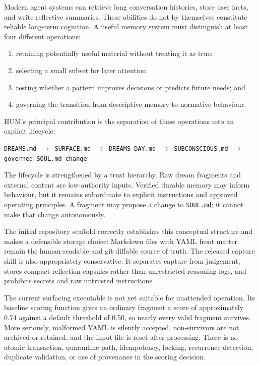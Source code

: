 \documentclass[11pt,a4paper]{article}
\begin{document}
Modern agent systems can retrieve long conversation histories, store user facts, and write reflective summaries. These abilities do not by themselves constitute reliable long-term cognition. A useful memory system must distinguish at least four different operations:

\begin{enumerate}
  \item retaining potentially useful material without treating it as true;
  \item selecting a small subset for later attention;
  \item testing whether a pattern improves decisions or predicts future needs; and
  \item governing the transition from descriptive memory to normative behaviour.
\end{enumerate}

HUM's principal contribution is the separation of those operations into an explicit lifecycle:

\begin{center}
\texttt{DREAMS.md $\rightarrow$ SURFACE.md $\rightarrow$ DREAMS\_DAY.md $\rightarrow$ SUBCONSCIOUS.md $\rightarrow$ governed SOUL.md change}
\end{center}

The lifecycle is strengthened by a trust hierarchy. Raw dream fragments and external content are low-authority inputs. Verified durable memory may inform behaviour, but it remains subordinate to explicit instructions and approved operating principles. A fragment may propose a change to \texttt{SOUL.md}; it cannot make that change autonomously.

The initial repository scaffold correctly establishes this conceptual structure and makes a defensible storage choice: Markdown files with YAML front matter remain the human-readable and git-diffable source of truth. The released capture skill is also appropriately conservative. It separates capture from judgement, stores compact reflection capsules rather than unrestricted reasoning logs, and prohibits secrets and raw untrusted instructions.

The current surfacing executable is not yet suitable for unattended operation. Its baseline scoring function gives an ordinary fragment a score of approximately 0.74 against a default threshold of 0.50, so nearly every valid fragment survives. More seriously, malformed YAML is silently accepted, non-survivors are not archived or retained, and the input file is reset after processing. There is no atomic transaction, quarantine path, idempotency, locking, recurrence detection, duplicate validation, or use of provenance in the scoring decision.
\end{document}
